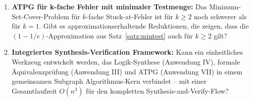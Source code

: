 ﻿\documentclass[a4paper,12pt]{article}
\theoremstyle{definition}
\begin{document}
\begin{enumerate}
  \item \textbf{ATPG für k-fache Fehler mit minimaler Testmenge:} Das Minimum-Set-Cover-Problem
        für $k$-fache Stuck-at-Fehler ist für $k \geq 2$ noch schwerer als für
        $k = 1$. Gibt es approximationserhaltende Reduktionen, die zeigen, dass die
        $(1-1/e)$-Approximation aus Satz~\ref{satz:mintest} auch für $k \geq 2$ gilt?

  \item \textbf{Integriertes Synthesis-Verification Framework:} Kann ein einheitliches
        Werkzeug entwickelt werden, das Logik-Synthese (Anwendung IV), formale
        Äquivalenz\-prüfung (Anwendung III) und ATPG (Anwendung VII) in einem
        gemeinsamen Subgraph Algorithmus-Kern verbindet -- mit einer Gesamtlaufzeit
        $O(n^3)$ für den kompletten Synthesis-and-Verify-Flow?
\end{enumerate}
\end{document}
